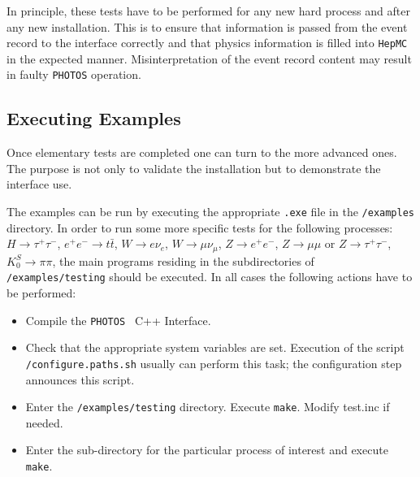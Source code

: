 \documentclass[]{Photos_interface_design}
\begin{document}
In principle, these tests have to be performed for any new hard 
process and after any new installation. This is to ensure that 
information is passed from the event record to the interface 
correctly and that physics information is filled into {\tt HepMC} 
in the expected manner. Misinterpretation of the event record content may result in 
faulty {\tt PHOTOS} operation.


\subsection{Executing Examples}

Once elementary tests are completed one can turn to the more advanced ones.
The purpose is not only to validate the installation but to demonstrate the
interface use.

The examples can be run by executing the appropriate {\tt .exe} file in the {\tt /examples} directory.
In order to run some more specific tests for the following processes:
$H \rightarrow \tau^+ \tau^-$, $ e^+ e^- \rightarrow t \bar t$,
$W \rightarrow e \nu_e$, $W \rightarrow \mu \nu_\mu$,
$Z \rightarrow e^+ e^-$, $Z \rightarrow \mu \mu$ or $Z \rightarrow \tau^+ \tau^-$,
$K_{0}^{S} \rightarrow \pi \pi$,
the main programs residing in the subdirectories of {\tt /examples/testing} should be executed.
In all cases the following actions have to be performed:

\begin{itemize}
  \item Compile the {\tt PHOTOS } C++ Interface. 
 \item  Check that the appropriate system variables are set. Execution of  the script \\
{\tt /configure.paths.sh} usually can perform this task; the configuration step 
announces this script.
  \item Enter the {\tt /examples/testing} directory. Execute {\tt make}. Modify test.inc if needed.
  \item Enter the sub-directory for the particular process of interest
and execute {\tt make}.
\end{itemize}
\end{document}

